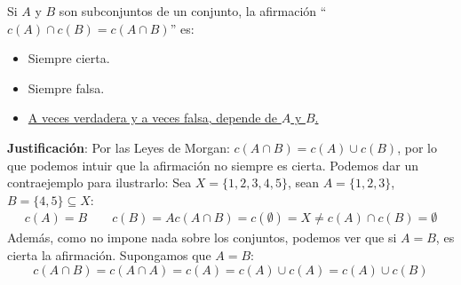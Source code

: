 \begin{ejercicio}
    Si $A$ y $B$ son subconjuntos de un conjunto, la afirmación \newline ``$c(A) \cap c(B) = c(A \cap B)$'' es:
    \begin{itemize}
        \item Siempre cierta.
        \item Siempre falsa.
        \item \underline{A veces verdadera y a veces falsa, depende de $A$ y $B$.}
    \end{itemize}

    \noindent
    \textbf{Justificación}:
    Por las Leyes de Morgan: $c(A \cap B) = c(A) \cup c(B)$, por lo que podemos intuir que la afirmación no siempre es cierta. Podemos dar un contraejemplo para ilustrarlo:\newline
    Sea $X = \{1,2,3,4,5\}$, sean $A = \{1,2,3\}$, $B = \{4,5\} \subseteq X$:
    \begin{gather*}
        c(A) = B\qquad c(B) = A
        c(A \cap B) = c(\emptyset) = X \neq c(A) \cap c(B) = \emptyset
    \end{gather*}
    Además, como no impone nada sobre los conjuntos, podemos ver que si $A = B$, es cierta la afirmación. Supongamos que $A = B$:
    \begin{equation*}
        c(A \cap B) = c(A \cap A) = c(A) = c(A) \cup c(A) = c(A) \cup c(B)
    \end{equation*}
\end{ejercicio}

